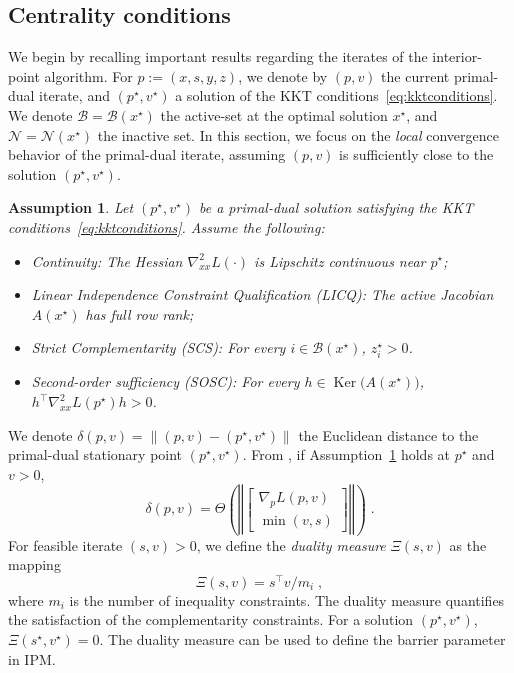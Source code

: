 \documentclass[smallextended]{svjour3}
\newtheorem{assumption}[theorem]{Assumption}
\DeclareMathOperator{\nullspace}{Ker}
\newcommand{\cactive}{\mathcal{B}}
\newcommand{\cinactive}{\mathcal{N}}
\begin{document}
\subsection{Centrality conditions}
We begin by recalling important results regarding the iterates of the interior-point algorithm.
For $p := (x, s, y, z)$, we denote by
$(p, v)$ the current primal-dual iterate,
and $(p^\star, v^\star)$ a solution of the KKT conditions~\eqref{eq:kktconditions}.
We denote $\cactive = \cactive(x^\star)$ the active-set at the optimal solution $x^\star$,
and $\cinactive = \cinactive(x^\star)$ the inactive set.
In this section, we focus on the \emph{local} convergence behavior of the
primal-dual iterate, assuming $(p, v)$ is sufficiently close to the solution
$(p^\star, v^\star)$.

\begin{assumption}
  \label{hyp:ipm}
  Let $(p^\star, v^\star)$ be a primal-dual solution
  satisfying the KKT conditions~\eqref{eq:kktconditions}. Assume the following:
  \begin{itemize}
  \item Continuity: The Hessian $\nabla^2_{x x} L(\cdot)$ is Lipschitz continuous
    near $p^\star$;
  \item Linear Independence Constraint Qualification (LICQ): The active Jacobian $A(x^\star)$ has full row rank;
  \item Strict Complementarity (SCS): For every $i \in \mathcal{B}(x^\star)$, $z_i^\star > 0$.
  \item Second-order sufficiency (SOSC): For every $h \in \nullspace\!\big(A(x^\star)\big)$,
    $h^\top \nabla_{x x}^2 L(p^\star)h > 0$.
  \end{itemize}
\end{assumption}

We denote $\delta(p, v) = \| (p, v) - (p^\star, v^\star) \|$ the Euclidean distance to the
primal-dual stationary point $(p^\star, v^\star)$.
From \cite[Theorem 2.2]{wright2001effects}, if Assumption~\ref{hyp:ipm}
holds at $p^\star$ and $v > 0$,
\begin{equation}
  \delta(p, v) = \Theta\left( \left\Vert \begin{bmatrix}
      \nabla_p L(p, v) \\ \min(v, s)
  \end{bmatrix}
  \right\Vert \right) \; .
\end{equation}
For feasible iterate $(s, v) > 0$, we define the \emph{duality measure} $\Xi(s, v)$ as the mapping
\begin{equation}
  \Xi(s, v) = s^\top v / m_i \; , %
\end{equation}
where $m_i$ is the number of inequality constraints.
The duality measure quantifies the satisfaction of the complementarity
constraints. For a solution $(p^\star, v^\star)$, $\Xi(s^\star, v^\star) = 0$.
The duality measure can be used to define the barrier parameter in IPM.
\end{document}

